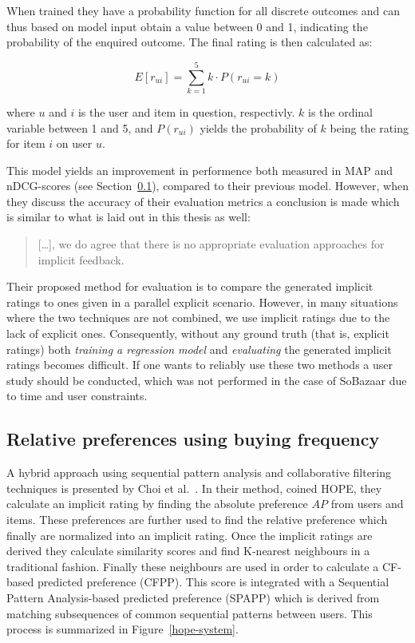 When trained they have a probability function for all discrete outcomes and can
thus based on model input obtain a value between 0 and 1, indicating the
probability of the enquired outcome. The final rating is then calculated as:

\begin{equation}
  E[r_{ui}] = \sum_{k=1}^{5} k \cdot P(r_{ui} = k)
\end{equation}

where $u$ and $i$ is the user and item in question, respectivly. $k$ is the
ordinal variable between 1 and 5, and $P(r_{ui})$ yields the probability of $k$
being the rating for item $i$ on user $u$.

This model yields an improvement in performence both measured in MAP and
nDCG-scores (see Section~\ref{}), compared to their previous model. However,
when they discuss the accuracy of their evaluation metrics a conclusion is made
which is similar to what is laid out in this thesis as well:

\begin{quotation}
  [\dots], we do agree that there is no appropriate evaluation approaches for
  implicit feedback.
\end{quotation}

Their proposed method for evaluation is to compare the generated implicit
ratings to ones given in a parallel explicit scenario. However, in many
situations where the two techniques are not combined, we use implicit ratings
due to the lack of explicit ones. Consequently, without any ground truth (that
is, explicit ratings) both \textit{training a regression model} and
\textit{evaluating} the generated implicit ratings becomes difficult. If one
wants to reliably use these two methods a user study should be conducted, which
was not performed in the case of SoBazaar due to time and user constraints.

\subsection{Relative preferences using buying frequency}
A hybrid approach using sequential pattern analysis and collaborative filtering
techniques is presented by Choi et al.~\cite{choi2012hybrid}. In their
method, coined HOPE, they calculate an implicit rating by finding the
absolute preference $AP$ from users and items. These preferences are further
used to find the relative preference which finally are normalized into an
implicit rating. Once the implicit ratings are derived they calculate
similarity scores and find K-nearest neighbours in a traditional fashion.
Finally these neighbours are used in order to calculate a CF-based predicted
preference (CFPP). This score is integrated with a Sequential Pattern
Analysis-based predicted preference (SPAPP) which is derived from matching
subsequences of common sequential patterns between users. This process is
summarized in Figure~\ref{hope-system}.

